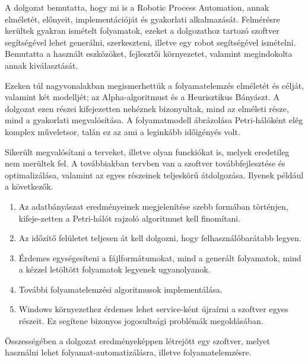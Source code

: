 
A dolgozat bemutatta, hogy mi is a Robotic Process Automation, annak elméletét, előnyeit, implementációját és gyakorlati alkalmazását. Felmérésre kerültek gyakran ismételt folyamatok, ezeket a dolgozathoz tartozó szoftver segítségével lehet generálni, szerkeszteni, illetve egy robot segítségével ismételni. Bemutatta a használt eszközöket, fejlesztői környezetet, valamint megindokolta annak kiválasztását.

Ezeken túl nagyvonalakban megismerhettük a folyamatelemzés elméletét és célját, valamint két modelljét; az Alpha-algoritmust és a Heurisztikus Bányászt. A dolgozat ezen részei kifejezetten nehéznek bizonyultak, mind az elméleti része, mind a gyakorlati megvalósítása. A folyamatmodell ábrázolása Petri-hálóként elég komplex műveletsor, talán ez az ami a leginkább időigényés volt.

Sikerült megvalósítani a terveket, illetve olyan funckiókat is, melyek eredetileg nem merültek fel.
A továbbiakban tervben van a szoftver továbbfejlesztése és optimalizálása, valamint az egyes részeinek teljeskörű átdolgozása. Ilyenek például a következők.
\begin{enumerate}
\item Az adatbányászat eredményeinek megjelenítése szebb formában történjen, kifeje\hyp{}zetten a Petri-hálót rajzoló algoritmust kell finomítani.
\item Az időzítő felületet teljesen át kell dolgozni, hogy felhasználóbarátabb legyen.
\item Érdemes egységesíteni a fájlformátumokat, mind a generált folyamatok, mind a kézzel letöltött folyamatok legyenek ugyanolyanok.
\item További folyamatelemzési algoritmusok implementálása.
\item Windows környezethez érdemes lehet service-ként újraírni a szoftver egyes részeit. Ez segítene bizonyos jogosultsági problémák megoldásában.
\end{enumerate}

Összességében a dolgozat eredményeképpen létrejött egy szoftver, melyet használni lehet folyamat\hyp{}automatizálásra, illetve folyamatelemzésre.